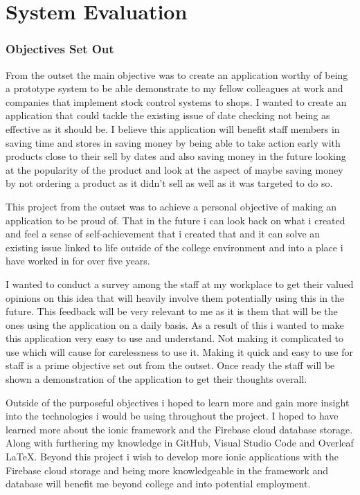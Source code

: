 \chapter{System Evaluation}

\subsection{Objectives Set Out}
From the outset the main objective was to create an application worthy of being a prototype system to be able demonstrate to my fellow colleagues at work and companies that implement stock control systems to shops. I wanted to create an application that could tackle the existing issue of date checking not being as effective as it should be. I believe this application will benefit staff members in saving time and stores in saving money by being able to take action early with products close to their sell by dates and also saving money in the future looking at the popularity of the product and look at the aspect of maybe saving money by not ordering a product as it didn't sell as well as it was targeted to do so.
\newline

This project from the outset was to achieve a personal objective of making an application to be proud of. That in the future i can look back on what i created and feel a sense of self-achievement that i created that and it can solve an existing issue linked to life outside of the college environment and into a place i have worked in for over five years. 
\newline

I wanted to conduct a survey among the staff at my workplace to get their valued opinions on this idea that will heavily involve them potentially using this in the future. This feedback will be very relevant to me as it is them that will be the ones using the application on a daily basis. As a result of this i wanted to make this application very easy to use and understand. Not making it complicated to use which will cause for carelessness to use it. Making it quick and easy to use for staff is a prime objective set out from the outset. Once ready the staff will be shown a demonstration of the application to get their thoughts overall.
\newline

Outside of the purposeful objectives i hoped to learn more and gain more insight into the technologies i would be using throughout the project. I hoped to have learned more about the ionic framework and the Firebase cloud database storage. Along with furthering my knowledge in GitHub, Visual Studio Code and Overleaf LaTeX. Beyond this project i wish to develop more ionic applications with the Firebase cloud storage and being more knowledgeable in the framework and database will benefit me beyond college and into potential employment.  

